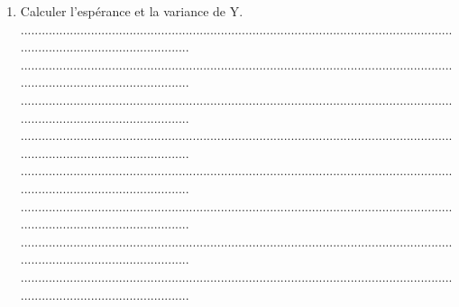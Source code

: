 \documentclass{article}
\begin{document}
\begin{footnotesize}
\begin{enumerate}
\begin{enumerate}
        ...........................................................................................................................................................................\newline
        ...........................................................................................................................................................................\newline
        ...........................................................................................................................................................................\newline\newline
        \item Calculer l'espérance et la variance de Y.\newline\newline
        ...........................................................................................................................................................................\newline
        ...........................................................................................................................................................................\newline
        ...........................................................................................................................................................................\newline
        ...........................................................................................................................................................................\newline
        ...........................................................................................................................................................................\newline
        ...........................................................................................................................................................................\newline
        ...........................................................................................................................................................................\newline
        ...........................................................................................................................................................................\newline

\end{enumerate}
\end{enumerate}
\end{footnotesize}
\end{document}
